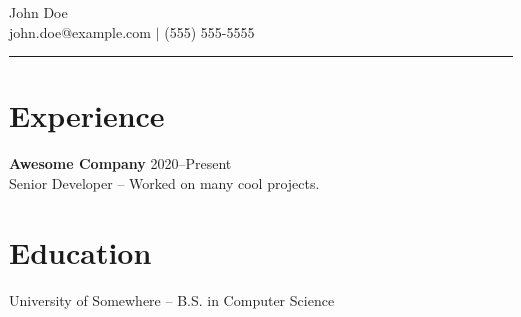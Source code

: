 \documentclass[11pt]{article}
\begin{document}
\begin{center}
  {\LARGE John Doe}\\
  \vspace{2mm}
  {\small john.doe@example.com $\vert$ (555) 555-5555}
\end{center}
\hrule
\vspace{4mm}
\section*{Experience}
\textbf{Awesome Company} \hfill 2020--Present\\
Senior Developer -- Worked on many cool projects.
\vspace{4mm}
\section*{Education}
University of Somewhere -- B.S. in Computer Science
\end{document}
